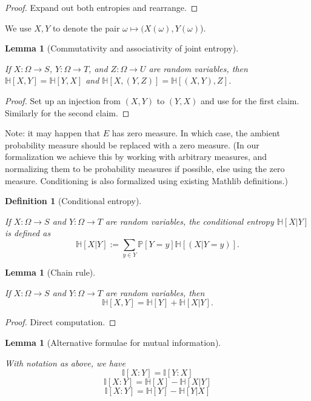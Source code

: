 \documentclass[10pt,a4paper]{article}
\newtheorem{lemma}[theorem]{Lemma}
\newtheorem{definition}[theorem]{Definition}
\newcommand{\lean}[1]{}
\newcommand{\uses}[1]{}
\newcommand{\leanok}{}
\newcommand{\bbH}{\mathbb{H}}
\newcommand{\bbP}{\mathbb{P}}
\newcommand{\bbI}{\mathbb{I}}
\begin{document}
\begin{proof} \leanok Expand out both entropies and rearrange.
\end{proof}


We use $X,Y$ to denote the pair $\omega \mapsto (X(\omega),Y(\omega)$).

\begin{lemma}[Commutativity and associativity of joint entropy]
  \label{entropy-comm}
  \lean{ProbabilityTheory.entropy_comm, ProbabilityTheory.entropy_assoc}
  \leanok
  If $X: \Omega \to S$, $Y: \Omega \to T$, and $Z: \Omega \to U$ are random variables, then $\bbH[X, Y] = \bbH[Y, X]$ and $\bbH[X, (Y,Z)] = \bbH[(X,Y), Z]$.
\end{lemma}
\begin{proof}
  \leanok
  \uses{relabeled-entropy}
  Set up an injection from $(X,Y)$ to $(Y,X)$ and use  for the first claim. Similarly for the second claim.
\end{proof}


Note: it may happen that $E$ has zero measure.  In which case, the ambient probability measure should be replaced with a zero measure.  (In our formalization we achieve this by working with arbitrary measures, and normalizing them to be probability measures if possible, else using the zero measure.  Conditioning is also formalized using existing Mathlib definitions.)

\begin{definition}[Conditional entropy]
  \label{conditional-entropy-def}
  \uses{entropy-def,condition-event-def}
  \lean{ProbabilityTheory.condEntropy}
  \leanok
  If $X: \Omega \to S$ and $Y: \Omega \to T$ are random variables, the conditional entropy $\bbH[X|Y]$ is defined as
  $$ \bbH[X|Y] := \sum_{y \in Y} \bbP[Y = y] \bbH[(X | Y=y)].$$
\end{definition}



\begin{lemma}[Chain rule]\label{chain-rule}
  \uses{conditional-entropy-def}
  \lean{ProbabilityTheory.chain_rule, ProbabilityTheory.chain_rule'}
  \leanok
  If $X: \Omega \to S$ and $Y: \Omega \to T$ are random variables, then
  $$ \bbH[X, Y] = \bbH[Y] + \bbH[X|Y].$$
  \end{lemma}
  \begin{proof}
  \leanok
  Direct computation.
\end{proof}


\begin{lemma}[Alternative formulae for mutual information]
  \label{alternative-mutual}
  \uses{information-def}
  \lean{ProbabilityTheory.mutualInfo_comm, ProbabilityTheory.mutualInfo_eq_entropy_sub_condEntropy}
  \leanok
  With notation as above, we have
  $$  \bbI[X : Y] = \bbI[Y:X]$$
  $$  \bbI[X : Y] = \bbH[X] - \bbH[X|Y]$$
  $$  \bbI[X : Y] = \bbH[Y] - \bbH[Y|X]$$
\end{lemma}
\end{document}
